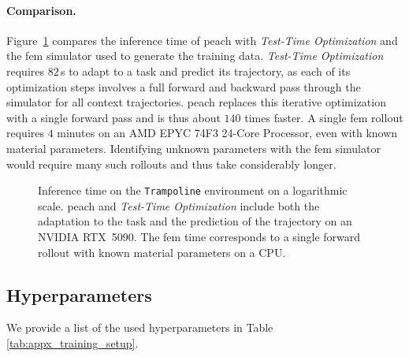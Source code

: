 \paragraph{Comparison.}
Figure~\ref{fig:runtime_comparison} compares the inference time of \gls{peach} with \textit{Test-Time Optimization} and the \gls{fem} simulator used to generate the training data. \textit{Test-Time Optimization} requires $82$\,s to adapt to a task and predict its trajectory, as each of its optimization steps involves a full forward and backward pass through the simulator for all context trajectories. \gls{peach} replaces this iterative optimization with a single forward pass and is thus about $140$ times faster. A single \gls{fem} rollout requires $4$ minutes on an AMD EPYC 74F3 24-Core Processor, even with known material parameters. Identifying unknown parameters with the \gls{fem} simulator would require many such rollouts and thus take considerably longer.

\begin{figure}[t]
    \centering
    
    \caption{Inference time on the \texttt{Trampoline} environment on a logarithmic scale. \gls{peach} and \textit{Test-Time Optimization} include both the adaptation to the task and the prediction of the trajectory on an NVIDIA RTX~5090. The \gls{fem} time corresponds to a single forward rollout with known material parameters on a CPU.}
    \label{fig:runtime_comparison}
\end{figure}



\subsection{Hyperparameters} \label{app:hp}
We provide a list of the used hyperparameters in Table \ref{tab:appx_training_setup}.

